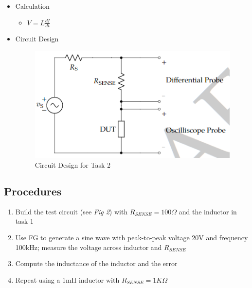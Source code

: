 \documentclass[journal, letterpaper]{IEEEtran}
\begin{document}
        \begin{itemize}
        \item Calculation
        	\begin{itemize}
        	\item $V = L\frac{dI}{dt}$
        	\end{itemize}
        \end{itemize}
            	\begin{itemize}
    	\item Circuit Design      \begin{figure}[!hbt]
        	\begin{center}
				\includegraphics[width=\columnwidth]{l7_2}
				\caption{Circuit Design for Task 2}
				\label{fig:l7_2}
			\end{center}
        \end{figure}
    	\end{itemize}
    \subsection{Procedures}
    	\begin{enumerate}
    	\item Build the test circuit (see \textit{Fig 2}) with $R_{SENSE}=100\Omega$ and the inductor in task 1
        \item Use FG to generate a sine wave with peak-to-peak voltage 20V and frequency 100kHz; measure the voltage across inductor and $R_{SENSE}$
        \item Compute the inductance of the inductor and the error
        \item Repeat using a 1mH inductor with $R_{SENSE}=1K\Omega$
    	\end{enumerate}
\end{document}
